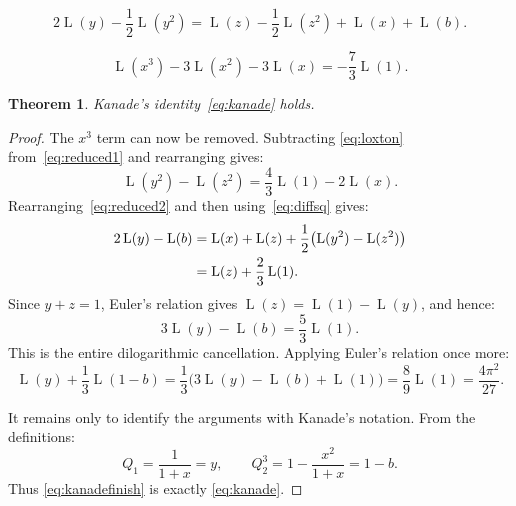 \documentclass[10pt,a4paper]{amsart}
\newtheorem{theorem}{Theorem}
\newcommand{\Lr}{\operatorname{L}}
\begin{document}
\begin{equation}\label{eq:reduced2}
2\Lr(y)-\frac12\Lr(y^2)
=\Lr(z)-\frac12\Lr(z^2)+\Lr(x)+\Lr(b).
\end{equation}

\begin{equation}\label{eq:loxton}
\Lr(x^3)-3\Lr(x^2)-3\Lr(x)=-\frac73\Lr(1).
\end{equation}

\begin{theorem}\label{thm:kanade}
Kanade's identity~\eqref{eq:kanade} holds.
\end{theorem}

\begin{proof}
The $x^3$ term can now be removed.  Subtracting
\eqref{eq:loxton} from~\eqref{eq:reduced1} and rearranging gives:
\begin{equation}\label{eq:diffsq}
\Lr(y^2)-\Lr(z^2)=\frac43\Lr(1)-2\Lr(x).
\end{equation}
Rearranging~\eqref{eq:reduced2} and then using~\eqref{eq:diffsq} gives:
\begin{align}
2\Lr(y)-\Lr(b)
&=\Lr(x)+\Lr(z)+\frac12\bigl(\Lr(y^2)-\Lr(z^2)\bigr)\notag\\
&=\Lr(z)+\frac23\Lr(1).\label{eq:intermediate}
\end{align}
Since $y+z=1$, Euler's relation gives $\Lr(z)=\Lr(1)-\Lr(y)$, and hence:
\begin{equation}\label{eq:keykanade}
3\Lr(y)-\Lr(b)=\frac53\Lr(1).
\end{equation}
This is the entire dilogarithmic cancellation.  Applying Euler's relation
once more:
\begin{equation}\label{eq:kanadefinish}
\Lr(y)+\frac13\Lr(1-b)
 =\frac13\bigl(3\Lr(y)-\Lr(b)+\Lr(1)\bigr)
 =\frac89\Lr(1)=\frac{4\pi^2}{27}.
\end{equation}

It remains only to identify the arguments with Kanade's notation.  From
the definitions:
\[
Q_1=\frac{1}{1+x}=y,
\qquad
Q_2^3=1-\frac{x^2}{1+x}=1-b.
\]
Thus \eqref{eq:kanadefinish} is exactly \eqref{eq:kanade}.
\end{proof}
\end{document}
